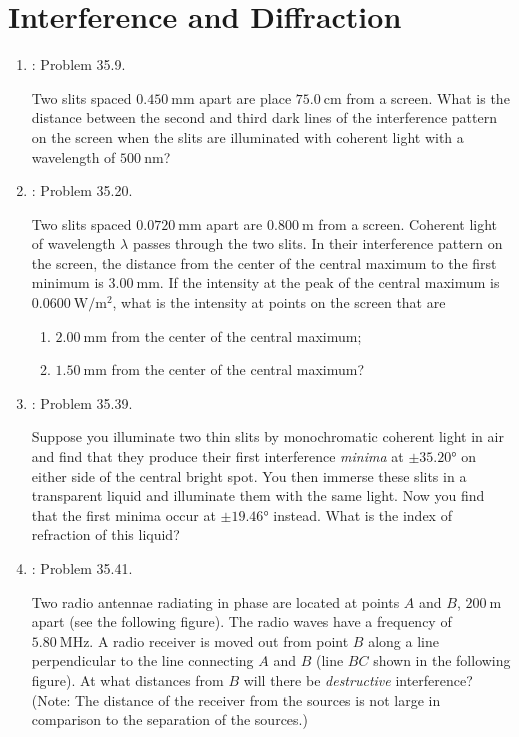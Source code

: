 \documentclass[../psets.tex]{subfiles}
\begin{document}
\section{Interference and Diffraction}
\begin{enumerate}[label={\arabic*)}]
    \item {}\textcite{bib:YoungFreedman}: Problem 35.9.\par
    Two slits spaced $\SI{0.450}{\milli\meter}$ apart are place $\SI{75.0}{\centi\meter}$ from a screen. What is the distance between the second and third dark lines of the interference pattern on the screen when the slits are illuminated with coherent light with a wavelength of $\SI{500}{\nano\meter}$?
    \item \textcite{bib:YoungFreedman}: Problem 35.20.\par
    Two slits spaced $\SI{0.0720}{\milli\meter}$ apart are $\SI{0.800}{\meter}$ from a screen. Coherent light of wavelength $\lambda$ passes through the two slits. In their interference pattern on the screen, the distance from the center of the central maximum to the first minimum is $\SI{3.00}{\milli\meter}$. If the intensity at the peak of the central maximum is $\SI{0.0600}{\watt\per\square\meter}$, what is the intensity at points on the screen that are
    \begin{enumerate}
        \item $\SI{2.00}{\milli\meter}$ from the center of the central maximum;
        \item $\SI{1.50}{\milli\meter}$ from the center of the central maximum?
    \end{enumerate}
    \item \textcite{bib:YoungFreedman}: Problem 35.39.\par
    Suppose you illuminate two thin slits by monochromatic coherent light in air and find that they produce their first interference \emph{minima} at $\pm\ang{35.20}$ on either side of the central bright spot. You then immerse these slits in a transparent liquid and illuminate them with the same light. Now you find that the first minima occur at $\pm\ang{19.46}$ instead. What is the index of refraction of this liquid?
    \item \textcite{bib:YoungFreedman}: Problem 35.41.\par
    Two radio antennae radiating in phase are located at points $A$ and $B$, $\SI{200}{\meter}$ apart (see the following figure). The radio waves have a frequency of $\SI{5.80}{\mega\hertz}$. A radio receiver is moved out from point $B$ along a line perpendicular to the line connecting $A$ and $B$ (line $BC$ shown in the following figure). At what distances from $B$ will there be \emph{destructive} interference? (Note: The distance of the receiver from the sources is not large in comparison to the separation of the sources.)
    \begin{center}
\end{center}
\end{enumerate}
\end{document}
